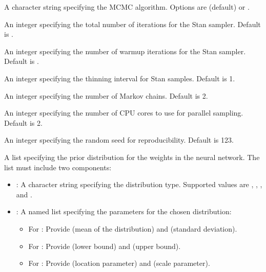 \documentclass[a4paper]{book}
\begin{document}
\begin{Arguments}
\begin{ldescription}
\item[\code{algorithm}] A character string specifying the MCMC algorithm. Options are  (default) or .

\item[\code{iter}] An integer specifying the total number of iterations for the Stan sampler. Default is .

\item[\code{warmup}] An integer specifying the number of warmup iterations for the Stan sampler. Default is .

\item[\code{thin}] An integer specifying the thinning interval for Stan samples. Default is 1.

\item[\code{chains}] An integer specifying the number of Markov chains. Default is 2.

\item[\code{cores}] An integer specifying the number of CPU cores to use for parallel sampling. Default is 2.

\item[\code{seed}] An integer specifying the random seed for reproducibility. Default is 123.

\item[\code{prior\_weights}] A list specifying the prior distribution for the weights in the neural network.
The list must include two components:
\begin{itemize}

\item{} : A character string specifying the distribution type. Supported values are
, , , and .
\item{} : A named list specifying the parameters for the chosen distribution:
\begin{itemize}

\item{} For : Provide  (mean of the distribution) and  (standard deviation).
\item{} For : Provide  (lower bound) and  (upper bound).
\item{} For : Provide  (location parameter) and  (scale parameter).

\end{itemize}



\end{itemize}
\end{ldescription}
\end{Arguments}
\end{document}
